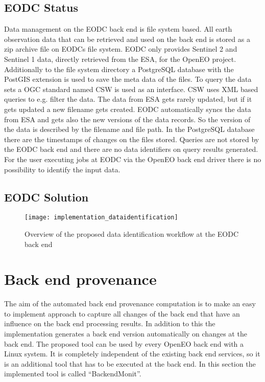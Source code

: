 \documentclass[draft,final]{vutinfth} %
\begin{document}
\subsection{EODC Status}
Data management on the EODC back end is file system based. All earth observation data that can be retrieved and used on the back end is stored as a zip archive file on EODCs file system. EODC only provides Sentinel 2 and Sentinel 1 data, directly retrieved from the ESA, for the OpenEO project. Additionally to the file system directory a PostgreSQL database with the PostGIS extension is used to save the meta data of the files. To query the data sets a OGC standard named CSW is used as an interface. CSW uses XML based queries to e.g. filter the data. The data from ESA gets rarely updated, but if it gets updated a new filename gets created. EODC automatically syncs the data from ESA and gets also the new versions of the data records. So the version of the data is described by the filename and file path. In the PostgreSQL database there are the timestamps of changes on the files stored. Queries are not stored by the EODC back end and there are no data identifiers on query results generated. For the user executing jobs at EODC via the OpenEO back end driver there is no possibility to identify the input data.            

\subsection{EODC Solution}

 

\begin{figure}[h]
	\centering
	\texttt{[image: implementation\_dataidentification]}
	\caption{Overview of the proposed data identification workflow at the EODC back end}
	\label{fig:impldataid} %
\end{figure}

\section{Back end provenance}\label{Implementation:Back end provenance}
The aim of the automated back end provenance computation is to make an easy to implement approach to capture all changes of the back end that have an influence on the back end processing results. In addition to this the implementation generates a back end version automatically on changes at the back end. The proposed tool can be used by every OpenEO back end with a Linux system. It is completely independent of the existing back end services, so it is an additional tool that has to be executed at the back end. In this section the implemented tool is called “BackendMonit”. 
\end{document}
